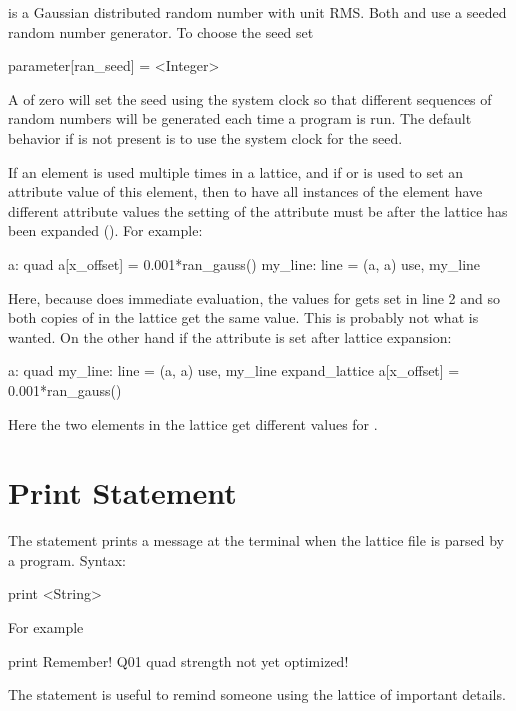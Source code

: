 {{
 is a Gaussian distributed random number with unit RMS. 
Both  and  use a seeded random number generator. 
To choose the seed set 
\begin{example}
  parameter[ran_seed] = <Integer>
\end{example}
A  of zero will set the seed using the system clock so that
different sequences of random numbers will be generated each time a
program is run.  The default behavior if  is
not present is to use the system clock for the seed.

If an element is used multiple times in a lattice, and if  or
 is used to set an attribute value of this element, then
to have all instances of the element have different attribute values
the setting of the attribute must be after the lattice has been
expanded (). For example:
\begin{example}
  a: quad 
  a[x_offset] = 0.001*ran_gauss()
  my_line: line = (a, a)
  use, my_line
\end{example}
Here, because \bmad does immediate evaluation, the 
values for  gets set in line 2 and so both copies of  in
the lattice get the same value. This is probably not what is wanted.
On the other hand if the attribute is set after lattice expansion:
\begin{example}
  a: quad 
  my_line: line = (a, a)
  use, my_line
  expand_lattice
  a[x_offset] = 0.001*ran_gauss()
\end{example}
Here the two  elements in the lattice get different values for
.

\section{Print Statement}
\label{s:print}

The  statement prints a message at the terminal when the 
lattice file is parsed by a program. Syntax:
\begin{example}
  print <String>
\end{example}
For example
\begin{example}
  print Remember! Q01 quad strength not yet optimized!
\end{example}
The  statement is useful to remind someone using the lattice of important details.

}}
